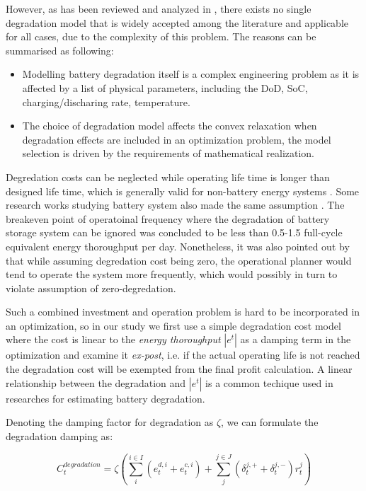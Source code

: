 However, as has been reviewed and analyzed in \cite{Megel2017}, there exists no single degradation model that is widely accepted among the literature and applicable for all cases, due to the complexity of this problem. The reasons can be summarised as following:
\begin{itemize}
	\item Modelling battery degradation itself is a complex engineering problem as it is affected by a list of physical parameters, including the DoD, SoC, charging/discharing rate, temperature.\cite{Barre2013}
	\item The choice of degradation model affects the convex relaxation when degradation effects are included in an optimization problem, the model selection is driven by the requirements of mathematical realization. \cite{Megel2017}
\end{itemize}

Degredation costs can be neglected while operating life time is longer than designed life time, which is generally valid for non-battery energy systems \cite{Bradbury2014}\cite{Zafirakis2016}\cite{Connolly2011}. Some research works studying battery system also made the same assumption  \cite{Byrne2012}\cite{McConnell2015}\cite{Sioshansi2009}. The breakeven point of operatoinal frequency where the degradation of battery storage system can be ignored was concluded to be less than 0.5-1.5 full-cycle equivalent energy thoroughput per day\cite{Megel2017}. Nonetheless, it was also pointed out by \cite{Megel2017} that while assuming degredation cost being zero, the operational planner would tend to operate the system more frequently, which would possibly in turn to violate assumption of zero-degredation.

Such a combined investment and operation problem is hard to be incorporated in an optimization, so in our study we first use a simple degradation cost model where the cost is linear to the \textit{energy thoroughput} $|e^t|$ as a damping term in the optimization and examine it \textit{ex-post}, i.e. if the actual operating life is not reached the degradation cost will be exempted from the final profit calculation. A linear relationship between the degradation and $|e^t|$ is a common techique used in researches for estimating battery degradation\cite{Byrne2012}\cite{Berrada2016}.

Denoting the damping factor for degradation as $\zeta$, we can formulate the degradation damping as:

\begin{equation}
\label{eq:degradation-damping}
C^{degradation}_t = \zeta (\sum_{i}^{i \in I}(e_t^{d,i}+e_t^{c,i})+\sum_{j}^{j \in J}(\delta_t^{j,+}+\delta_t^{j,-})r_t^j)
\end{equation}

